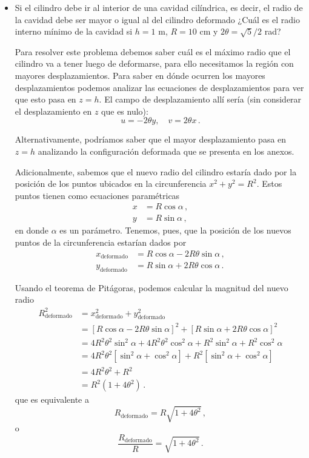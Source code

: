 \documentclass[../notas medios.tex]{subfiles}
\begin{document}
\begin{itemize}
\item
Si el cilindro debe ir al interior de una cavidad cilíndrica, es decir, el radio de la cavidad debe ser mayor o igual al del cilindro deformado ¿Cuál es el radio interno mínimo de la cavidad si $h=1$ m, $R = 10$ cm y $2\theta = \sqrt{5}/2$ rad?


Para resolver este problema debemos saber cuál es el máximo radio que el cilindro va a tener luego de deformarse, para ello necesitamos la región con mayores desplazamientos. Para saber en dónde ocurren los mayores desplazamientos podemos analizar las ecuaciones de desplazamientos para ver que esto pasa en $z=h$. El campo de desplazamiento allí sería (sin considerar el desplazamiento en $z$ que es nulo):
\[u = -2\theta y,\quad v = 2\theta x\, .\]

Alternativamente, podríamos saber que el mayor desplazamiento pasa en $z=h$ analizando la configuración deformada que se presenta en los anexos.

Adicionalmente, sabemos que el nuevo radio del cilindro estaría dado por la posición de los puntos ubicados en la circunferencia $x^2 + y^2 = R^2$. Estos puntos tienen como ecuaciones paramétricas
\begin{align*}
  x &= R \cos\alpha\, ,\\
  y &= R \sin\alpha\, ,
\end{align*}
en donde $\alpha$ es un parámetro. Tenemos, pues, que la posición de los nuevos puntos de la circunferencia estarían dados por
\begin{align*}
  x_\text{deformado} &= R \cos\alpha - 2R\theta \sin\alpha \, ,\\
  y_\text{deformado} &= R \sin\alpha + 2R\theta \cos\alpha\, .
\end{align*}

Usando el teorema de Pitágoras, podemos calcular la magnitud del nuevo radio
\begin{align*}
  R_\text{deformado}^2 &= x_\text{deformado}^2 + y_\text{deformado}^2\\
    &= [R \cos\alpha - 2R\theta \sin\alpha]^2 + [R \sin\alpha + 2R\theta \cos\alpha]^2\\
    &= 4R^2\theta^2\sin^2\alpha + 4R^2\theta^2\cos^2\alpha + R^2\sin^2\alpha + R^2\cos^2\alpha\\
    &= 4R^2\theta^2[\sin^2\alpha + \cos^2\alpha] + R^2[\sin^2\alpha + \cos^2\alpha]\\
    &= 4R^2\theta^2 + R^2\\
    &= R^2 (1 + 4\theta^2)\, .
\end{align*}
que es equivalente a
\[R_\text{deformado} = R\sqrt{1 + 4\theta^2}\, ,\]
o
\[\frac{R_\text{deformado}}{R} = \sqrt{1 + 4\theta^2}\, .\]


\end{itemize}
\end{document}
